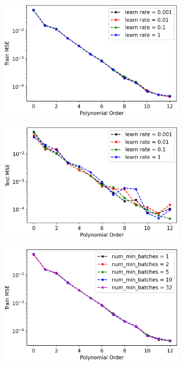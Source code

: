 \begin{figure}[H]
\centering
\begin{subfigure}{.49\textwidth}
  \centering
  \includegraphics[width=.9\linewidth]{Images/olssgd_train_learn_rate_all_batch_32_epoch_10.png}
  \caption{}
  \label{fig:olssgd_train_learn_rate}
\end{subfigure}%
\begin{subfigure}{.49\textwidth}
  \centering
  \includegraphics[width=.9\linewidth]{Images/olssgd_test_learn_rate_all_batch_32_epoch_10.png}
  \caption{}
  \label{fig:olssgd_test_learn_rate}
\end{subfigure}
\begin{subfigure}{.49\textwidth}
  \centering
  \includegraphics[width=.9\linewidth]{Images/olssgd_train_learn_rate_1_batch_all_epoch_10.png.png}

\end{subfigure}
\end{figure}
